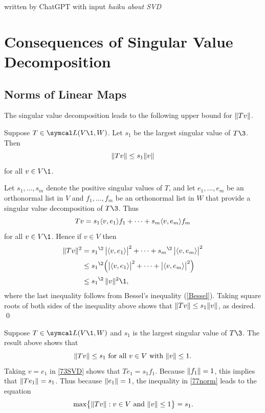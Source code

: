 {written by ChatGPT with input \textit{haiku about SVD}}

\section{Consequences of Singular Value Decomposition} \label{9SVD}

\subsection{Norms of Linear Maps}

The singular value decomposition leads to the following upper bound for $\norm{Tv}$.

{Suppose $T \in \L(V\1, W)$. Let $s_1$ be the largest singular value of $T\3$. Then
\[
\norm{Tv} \le s_1 \norm{v}
\]
for all $v \in V\1$.}


\proof
Let $s_1, \ldots, s_m$ denote the positive singular values of $T$, and let $e_1, \ldots, e_m$ be an orthonormal list in $V$ and $f_1, \ldots, f_m$ be an orthonormal list in $W$ that provide a singular value decomposition of $T\3$. Thus
\begin{equation} \label{73SVD}
Tv = s_1 \ip{v, e_1}f_1 + \cdots + s_m \ip{v, e_m}f_m
\end{equation}
for all $v \in V\1$. Hence if $v \in V$ then
\begin{align*}
\norm{Tv}^2 &= {s_1}^{\2} \, \abs[\big]{ \ip{v,e_1} }^2 + \cdots + {s_m}^{\2} \, \abs[\big]{ \ip{v,e_m} }^2 \\[2bp]
&\le {s_1}^{\2} \paren[\Big]{ \abs[\big]{ \ip{v,e_1} }^2 + \cdots + \abs[\big]{ \ip{v,e_m} }^2 } \\[2bp]
&\le {s_1}^{\2} \, \norm{v}^2\1,
\end{align*}
where the last inequality follows from Bessel's inequality (\ref{Bessel}). Taking square roots of both sides of the inequality above shows that $\norm{Tv} \le s_1 \norm{v}$, as desired.
\qed

Suppose $T \in \L(V\1,W) $ and $s_1$ is the largest singular value of $T\3$. The result above shows that
\begin{equation} \label{77norm}
\norm{Tv} \le s_1 \text{ for all } v \in V \text{ with } \norm{v} \le 1.
\end{equation}%
Taking $v = e_1$ in \ref{73SVD} shows that $Te_1 = s_1 f_1$. Because $\norm{f_1} = 1$, this implies that
$\norm{Te_1} = s_1$. Thus because $\norm{e_1} = 1$, the inequality in \ref{77norm} leads to the equation
\begin{equation} \label{7max}
\max \br[\big]{ \norm{Tv} : v \in V \text{ and } \norm{v} \le 1} = s_1.
\end{equation}

